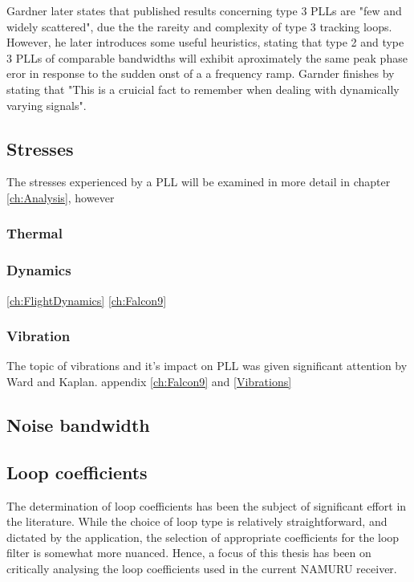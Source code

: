     Gardner later states that published results concerning type 3 PLLs are "few and widely scattered", due the the rareity and complexity of type 3 tracking loops. However, he later introduces some useful heuristics, stating that type 2 and type 3 PLLs of comparable bandwidths will exhibit aproximately the same peak phase eror in response to the sudden onst of a a frequency ramp\cite{Gardner}.  Garnder finishes by stating that "This is a cruicial fact to remember when dealing with dynamically varying signals".

    
    
	\subsection{Stresses}
	    The stresses experienced by a PLL will be examined in more detail in chapter \ref{ch:Analysis}, however 
	    
		\subsubsection{Thermal}


		\subsubsection{Dynamics}
		\ref{ch:FlightDynamics}
		\ref{ch:Falcon9}


		\subsubsection{Vibration}
		The topic of vibrations and it's impact on PLL was given significant attention by Ward and Kaplan. 
		appendix \ref{ch:Falcon9} and \ref{Vibrations}
		
    \subsection{Noise bandwidth}
    
    
	\subsection{Loop coefficients}
	The determination of loop coefficients has been the subject of significant effort in the literature.  While the choice of loop type is relatively straightforward, and dictated by the application, the selection of appropriate coefficients for the loop filter is somewhat more nuanced. Hence, a focus of this thesis has been on critically analysing the loop coefficients used in the current \ac{NAMURU} receiver. 
	
